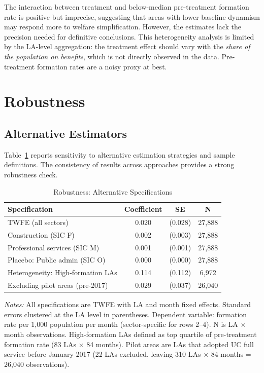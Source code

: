 \documentclass[12pt]{article}
\begin{document}
The interaction between treatment and below-median pre-treatment formation rate is positive but imprecise, suggesting that areas with lower baseline dynamism may respond more to welfare simplification. However, the estimates lack the precision needed for definitive conclusions. This heterogeneity analysis is limited by the LA-level aggregation: the treatment effect should vary with the \textit{share of the population on benefits}, which is not directly observed in the data. Pre-treatment formation rates are a noisy proxy at best.


\section{Robustness}
\label{sec:robustness}

\subsection{Alternative Estimators}

Table~\ref{tab:robustness} reports sensitivity to alternative estimation strategies and sample definitions. The consistency of results across approaches provides a strong robustness check.

\begin{table}[t]
\centering
\caption{Robustness: Alternative Specifications}
\label{tab:robustness}
\begin{threeparttable}
\begin{tabular}{lccc}
\toprule
Specification & Coefficient & SE & N \\
\midrule
TWFE (all sectors) & 0.020 & (0.028) & 27,888 \\
Construction (SIC F) & 0.002 & (0.003) & 27,888 \\
Professional services (SIC M) & 0.001 & (0.001) & 27,888 \\
Placebo: Public admin (SIC O) & 0.000 & (0.000) & 27,888 \\
Heterogeneity: High-formation LAs & 0.114 & (0.112) & 6,972 \\
Excluding pilot areas (pre-2017) & 0.029 & (0.037) & 26,040 \\
\bottomrule
\end{tabular}
\begin{tablenotes}
\small
\item \textit{Notes:} All specifications are TWFE with LA and month fixed effects. Standard errors clustered at the LA level in parentheses. Dependent variable: formation rate per 1,000 population per month (sector-specific for rows 2--4). N is LA $\times$ month observations. High-formation LAs defined as top quartile of pre-treatment formation rate (83 LAs $\times$ 84 months). Pilot areas are LAs that adopted UC full service before January 2017 (22 LAs excluded, leaving 310 LAs $\times$ 84 months = 26,040 observations).
\end{tablenotes}
\end{threeparttable}
\end{table}
\end{document}
